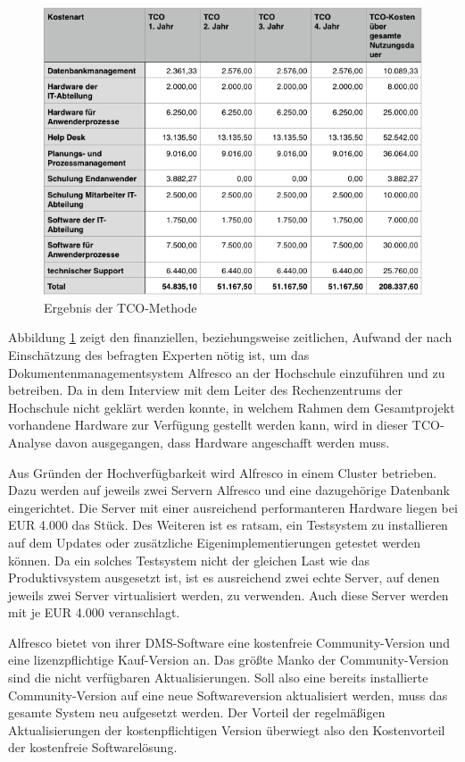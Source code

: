 \begin{figure}[h]
	\centering
	\includegraphics[width=\textwidth]
	{kapitel/gruppe4_2/bilder/tabelle_ergebnis_tco_methode}
	\caption{Ergebnis der TCO-Methode}
	\label{tab_ergebnis_TCO_Methode}
\end{figure}

Abbildung \ref{tab_ergebnis_TCO_Methode} zeigt den finanziellen, beziehungsweise zeitlichen, 
Aufwand der nach Einschätzung des befragten Experten nötig ist, um das 
Dokumentenmanagementsystem Alfresco an der Hochschule einzuführen und zu betreiben. 
Da in dem Interview mit dem Leiter des Rechenzentrums der Hochschule nicht geklärt werden 
konnte, in welchem Rahmen dem Gesamtprojekt vorhandene Hardware zur Verfügung gestellt 
werden kann, wird in dieser TCO-Analyse davon ausgegangen, dass Hardware angeschafft 
werden muss.

Aus Gründen der Hochverfügbarkeit wird Alfresco in einem Cluster betrieben. Dazu werden auf 
jeweils zwei Servern Alfresco und eine dazugehörige Datenbank eingerichtet. Die Server mit 
einer ausreichend performanteren Hardware liegen bei EUR 4.000 das Stück. Des Weiteren ist 
es ratsam, ein Testsystem zu installieren auf dem Updates oder zusätzliche 
Eigenimplementierungen getestet werden können. Da ein solches Testsystem nicht der gleichen 
Last wie das Produktivsystem ausgesetzt ist, ist es ausreichend zwei echte Server, auf denen jeweils 
zwei Server virtualisiert werden, zu verwenden. Auch diese Server werden mit je EUR 4.000 
veranschlagt.
\newpage

Alfresco bietet von ihrer DMS-Software eine kostenfreie Community-Version und eine lizenzpflichtige Kauf-Version an. Das größte Manko der Community-Version sind die nicht verfügbaren Aktualisierungen. Soll also eine bereits installierte Community-Version auf eine neue Softwareversion aktualisiert werden, muss das gesamte System neu aufgesetzt werden. Der Vorteil der regelmäßigen Aktualisierungen der kostenpflichtigen Version überwiegt also den Kostenvorteil der kostenfreie Softwarelösung.

